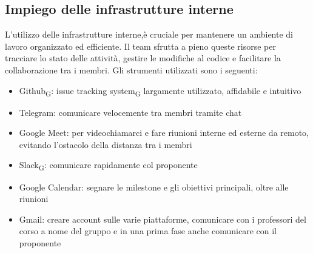 \documentclass{article}
\begin{document}
\subsection{Impiego delle infrastrutture interne}
L'utilizzo delle infrastrutture interne,è cruciale per mantenere un ambiente di lavoro organizzato ed efficiente. Il team sfrutta a pieno queste risorse per tracciare lo stato delle attività, gestire le modifiche al codice e facilitare la collaborazione tra i membri. Gli strumenti utilizzati sono i seguenti:
\begin{itemize}
    \item Github\textsubscript{G}: issue tracking system\textsubscript{G} largamente utilizzato, affidabile e intuitivo
    \item Telegram: comunicare velocemente tra membri tramite chat
    \item Google Meet: per videochiamarci e fare riunioni interne ed esterne da remoto, evitando l'ostacolo della distanza tra i membri
    \item Slack\textsubscript{G}: comunicare rapidamente col proponente
    \item Google Calendar: segnare le milestone e gli obiettivi principali, oltre alle riunioni
    \item Gmail: creare account sulle varie piattaforme, comunicare con i professori del corso a nome del gruppo e in una prima fase anche comunicare con il proponente
    
\end{itemize}
\end{document}

